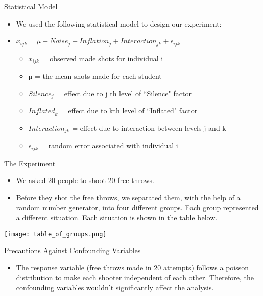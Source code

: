 \documentclass[ignorenonframetext,]{beamer}
\providecommand{\tightlist}{%
\setlength{\itemsep}{0pt}\setlength{\parskip}{0pt}}
\begin{document}
\begin{frame}{Statistical Model}

\begin{itemize}
\item We used the following statistical model to design our experiment:
\item $x_{ijk} = \mu + Noise_j + Inflation_j + Interaction_{jk} + \epsilon_{ijk}$
\begin{itemize}
\item $x_{ijk}$ = observed made shots for individual i
\item µ = the mean shots made for each student
\item $Silence_j$ = effect due to j th level of “Silence" factor
\item $Inflated_k$ = effect due to kth level of “Inflated" factor
\item $Interaction_{jk}$ = effect due to interaction between levels j and k
\item $\epsilon_{ijk}$ = random error associated with individual i
\end{itemize}
\end{itemize}

\end{frame}

\begin{frame}{The Experiment}

\begin{itemize}
\tightlist
\item
  We asked 20 people to shoot 20 free throws.
\item
  Before they shot the free throws, we separated them, with the help of
  a random number generator, into four different groups. Each group
  represented a different situation. Each situation is shown in the
  table below.
\end{itemize}

\texttt{[image: table\_of\_groups.png]}

\end{frame}

\begin{frame}{Precautions Against Confounding Variables}

\begin{itemize}
\tightlist
\item
  The response variable (free throws made in 20 attempts) 
  follows a poisson distribution to make each shooter
  independent of each other. Therefore, the confounding variables wouldn't significantly affect the analysis. 
\end{itemize}

\end{frame}
\end{document}
